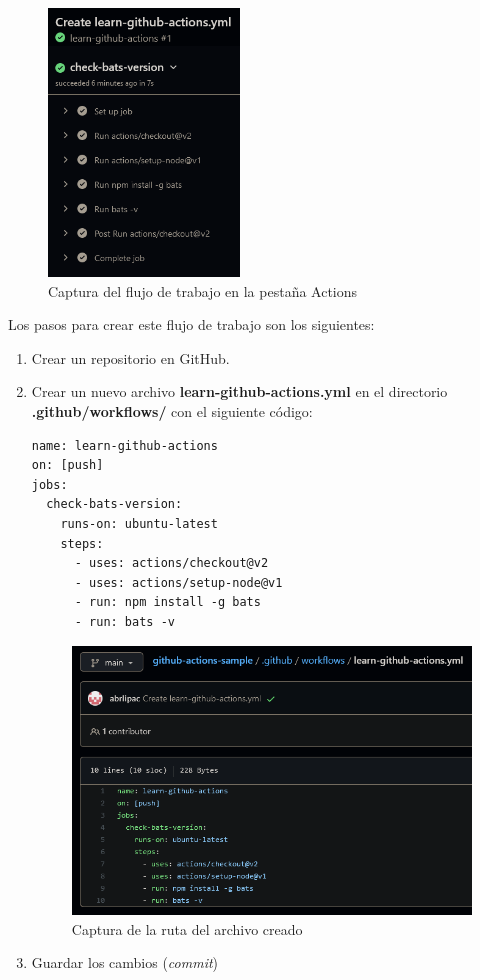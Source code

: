 \documentclass[twoside,twocolumn]{article}
\begin{document}
\begin{figure}[!h]
    \begin{center}
        \includegraphics[width = 2in]{./Imagenes/Screenshot_2.png}
        \caption{Captura del flujo de trabajo en la pestaña Actions}
    \end{center}
\end{figure}

Los pasos para crear este flujo de trabajo son los siguientes:

\begin{enumerate}

    \item Crear un repositorio en GitHub.
    \item Crear un nuevo archivo \textbf{learn-github-actions.yml} en el directorio \textbf{.github/workflows/} con el siguiente código:

\begin{verbatim}
name: learn-github-actions
on: [push]
jobs:
  check-bats-version:
    runs-on: ubuntu-latest
    steps:
      - uses: actions/checkout@v2
      - uses: actions/setup-node@v1
      - run: npm install -g bats
      - run: bats -v
\end{verbatim}

\begin{figure}[h]
    \includegraphics[width = \columnwidth]{Imagenes/Screenshot_1.png}
    \caption{Captura de la ruta del archivo creado}
\end{figure}

    \item Guardar los cambios (\textit{commit})

\end{enumerate}
\end{document}
